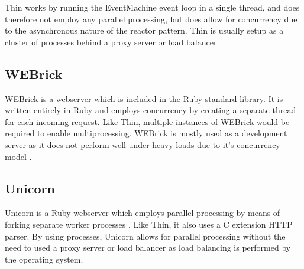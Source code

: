Thin works by running the EventMachine event loop in a single thread, and
does therefore not employ any parallel processing, but does allow for
concurrency due to the asynchronous nature of the reactor pattern. Thin is
usually setup as a cluster of processes behind a proxy server or load
balancer.

\subsection{WEBrick}
WEBrick is a webserver which is included in the Ruby standard library. It is
written entirely in Ruby and employs concurrency by creating a separate thread
for each incoming request. Like Thin, multiple instances of WEBrick would be
required to enable multiprocessing. WEBrick is mostly used as a development
server as it does not perform well under heavy loads due to it's concurrency
model \cite{webrick}.

\subsection{Unicorn}
Unicorn is a Ruby webserver which employs parallel processing by means of
forking separate worker processes \cite{unicorndocs}. Like Thin, it also uses
a C extension HTTP parser. By using processes, Unicorn allows for parallel
processing without the need to used a proxy server or load balancer as load
balancing is performed by the operating system.

